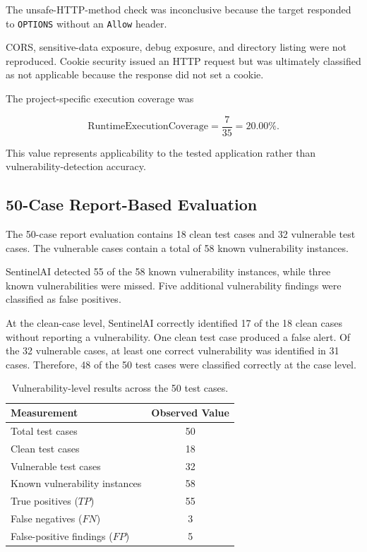 \documentclass[journal]{IEEEtran}
\begin{document}
The unsafe-HTTP-method check was inconclusive because the target responded to
\texttt{OPTIONS} without an \texttt{Allow} header.

CORS, sensitive-data exposure, debug exposure, and directory listing were not
reproduced. Cookie security issued an HTTP request but was ultimately
classified as not applicable because the response did not set a cookie.

The project-specific execution coverage was

\begin{equation}
\mathrm{RuntimeExecutionCoverage}
=
\frac{7}{35}
=
20.00\%.
\end{equation}

This value represents applicability to the tested application rather than
vulnerability-detection accuracy.

\subsection{50-Case Report-Based Evaluation}

The 50-case report evaluation contains 18 clean test cases and 32 vulnerable
test cases. The vulnerable cases contain a total of 58 known vulnerability
instances.

SentinelAI detected 55 of the 58 known vulnerability instances, while three
known vulnerabilities were missed. Five additional vulnerability findings
were classified as false positives.

At the clean-case level, SentinelAI correctly identified 17 of the 18 clean
cases without reporting a vulnerability. One clean test case produced a
false alert. Of the 32 vulnerable cases, at least one correct vulnerability
was identified in 31 cases. Therefore, 48 of the 50 test cases were
classified correctly at the case level.

\begin{table}[!t]
\centering
\caption{Vulnerability-level results across the 50 test cases.}
\label{tab:vulnerability-level-summary}
\begin{tabular}{lc}
\toprule
\textbf{Measurement} & \textbf{Observed Value} \\
\midrule
Total test cases & 50 \\
Clean test cases & 18 \\
Vulnerable test cases & 32 \\
Known vulnerability instances & 58 \\
True positives ($TP$) & 55 \\
False negatives ($FN$) & 3 \\
False-positive findings ($FP$) & 5 \\
\bottomrule
\end{tabular}
\end{table}
\end{document}
